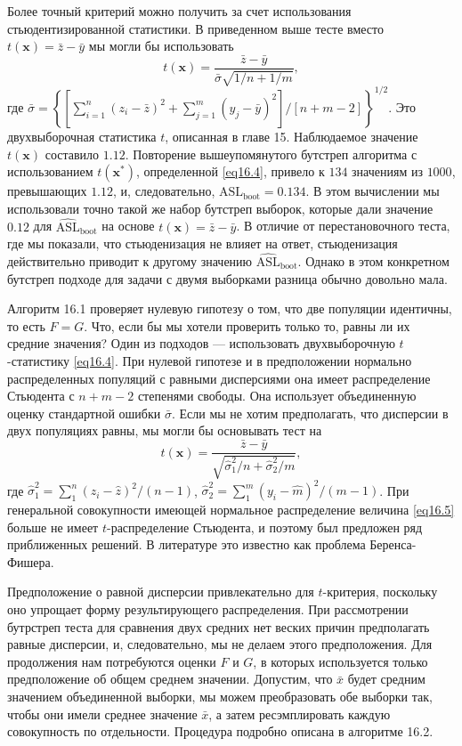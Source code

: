 Более точный критерий можно получить за счет использования стьюдентизированной статистики. В приведенном выше тесте вместо $t(\mathbf{x}) = \bar{z}-\bar{y}$ мы могли бы использовать
\begin{equation}\label{eq16.4}
    t(\mathbf{x}) = \frac{\bar{z}-\bar{y}}{\bar{\sigma}\sqrt{1/n+1/m}},
\end{equation}
где $\bar{\sigma} = \left\{\left[\sum_{i=1}^{n}(z_i-\bar{z})^2 + \sum_{j=1}^{m}(y_j-\bar{y})^2\right]/\left[n+m-2\right]\right\}^{1/2}$. Это двухвыборочная статистика $t$, описанная в главе 15. Наблюдаемое значение $t(\mathbf{x})$ составило $1.12$. Повторение вышеупомянутого бутстреп алгоритма с использованием $t(\mathbf{x}^{*})$, определенной \ref{eq16.4}, привело к $134$ значениям из $1000$, превышающих $1.12$, и, следовательно, $\text{ASL}_{\text{boot}} = 0.134$. В этом вычислении мы использовали точно такой же набор бутстреп выборок, которые дали значение $0.12$ для $\widehat{\text{ASL}}_{\text{boot}}$ на основе $t(\mathbf{x}) = \bar{z}-\bar{y}$. В отличие от перестановочного теста, где мы показали, что стьюденизация не влияет на ответ, стьюденизация действительно приводит к другому значению $\widehat{\text{ASL}}_{\text{boot}}$. Однако в этом конкретном бутстреп подходе для задачи с двумя выборками разница обычно довольно мала.

Алгоритм 16.1 проверяет нулевую гипотезу о том, что две популяции идентичны, то есть $F = G$. Что, если бы мы хотели проверить только то, равны ли их средние значения? Один из подходов --- использовать двухвыборочную $t$-статистику \ref{eq16.4}. При нулевой гипотезе и в предположении нормально распределенных популяций с равными дисперсиями она имеет распределение Стьюдента с $n + m- 2$ степенями свободы. Она использует объединенную оценку стандартной ошибки $\bar{\sigma}$. Если мы не хотим предполагать, что дисперсии в двух популяциях равны, мы могли бы основывать тест на
\begin{equation}\label{eq16.5}
    t(\mathbf{x}) = \frac{\bar{z}-\bar{y}}{\sqrt{\hat{\sigma}^2_1/n + \hat{\sigma}^2_2/m}},
\end{equation}
где $\hat{\sigma}^2_1 = \sum_1^n(z_i-\hat{z})^2/(n-1)$, $\hat{\sigma}^2_2 = \sum_1^m(y_i-\hat{m})^2/(m-1)$. При генеральной совокупности имеющей нормальное распределение величина \ref{eq16.5} больше не имеет $t$-распределение Стьюдента, и поэтому был предложен ряд приближенных решений. В литературе это известно как проблема Беренса-Фишера. 

Предположение о равной дисперсии привлекательно для $t$-критерия, поскольку оно упрощает форму результирующего распределения. При рассмотрении бутрстреп теста для сравнения двух средних нет веских причин предполагать равные дисперсии, и, следовательно, мы не делаем этого предположения. Для продолжения нам потребуются оценки $F$ и $G$, в которых используется только предположение об общем среднем значении. Допустим, что $\bar{x}$ будет средним значением объединенной выборки, мы можем преобразовать обе выборки так, чтобы они имели среднее значение $\bar{x}$, а затем ресэмплировать каждую совокупность по отдельности. Процедура подробно описана в алгоритме 16.2. 

